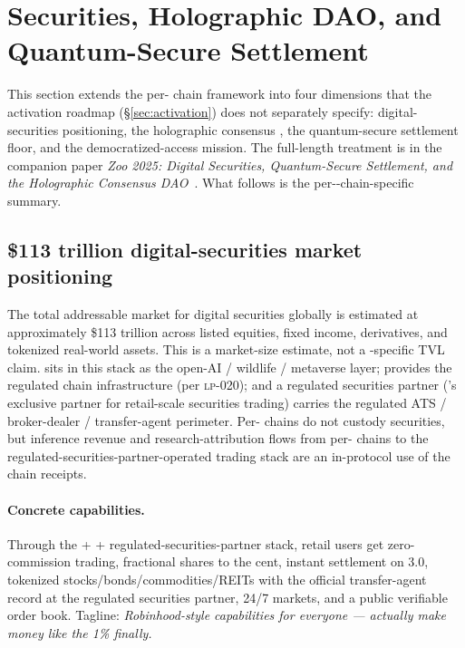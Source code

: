 \section{Securities, Holographic DAO, and Quantum-Secure Settlement}
\label{sec:securities-and-dao}

This section extends the per-\LLM{} chain framework into four
dimensions that the activation roadmap (\S\ref{sec:activation}) does
not separately specify: digital-securities positioning, the holographic
consensus \DAO{}, the quantum-secure settlement floor, and the
democratized-access mission. The full-length treatment is in the
companion paper \emph{Zoo 2025: Digital Securities, Quantum-Secure
Settlement, and the Holographic Consensus DAO}~\cite{zoo-2025-securities-and-dao}.
What follows is the per-\LLM{}-chain-specific summary.

\subsection{\$113 trillion digital-securities market positioning}
\label{sec:113t}

The total addressable market for digital securities globally is
estimated at approximately \$113 trillion across listed equities,
fixed income, derivatives, and tokenized real-world assets. This is a
market-size estimate, not a \Zoo{}-specific TVL claim. \Zoo{} sits in
this stack as the open-AI / wildlife / metaverse layer; \Lux{}
provides the regulated chain infrastructure (per \textsc{lp-020}); and
a regulated securities partner (\Zoo{}'s exclusive
partner for retail-scale securities trading) carries the regulated ATS / broker-dealer / transfer-agent
perimeter. Per-\LLM{} chains do not custody securities, but inference
revenue and research-attribution flows from per-\LLM{} chains to the
regulated-securities-partner-operated trading stack are an in-protocol use of the
chain receipts.

\paragraph{Concrete capabilities.}
Through the \Zoo{} + \Lux{} + regulated-securities-partner stack, retail users get
zero-commission trading, fractional shares to the cent, instant
settlement on \Quasar{} 3.0, tokenized stocks/bonds/commodities/REITs
with the official transfer-agent record at the regulated securities partner, 24/7 markets,
and a public verifiable order book. Tagline: \emph{Robinhood-style
capabilities for everyone --- actually make money like the 1\%
finally.}

